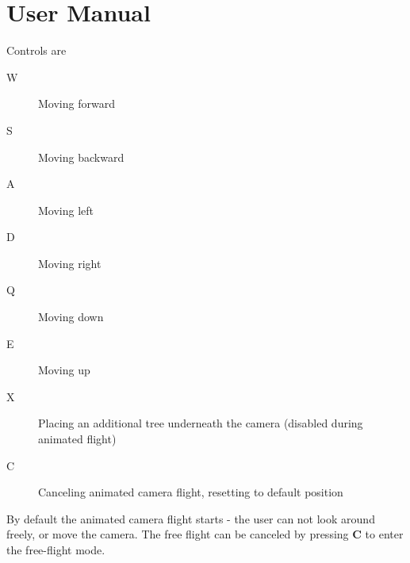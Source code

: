 \section{User Manual} \label{manual}
Controls are
\begin{description}
	\item[W] Moving forward
	\item[S] Moving backward
	\item[A] Moving left
	\item[D] Moving right
	\item[Q] Moving down
	\item[E] Moving up
	\item[X] Placing an additional tree underneath the camera (disabled during animated flight)
	\item[C] Canceling animated camera flight, resetting to default position
\end{description}
By default the animated camera flight starts - the user can not look around freely, or move the camera.
The free flight can be canceled by pressing \textbf{C} to enter the free-flight mode.